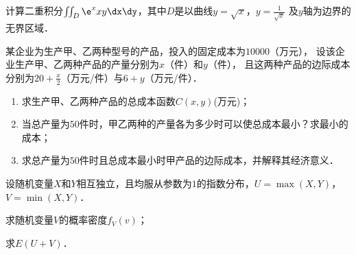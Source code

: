 \documentclass[plain,noanswer,medmath]{../../template/jnuexam}
\begin{document}
\begin{problem}[points=10]
计算二重积分$\iint_D \e^x xy\dx\dy$，其中$D$是以曲线$y = \sqrt{x}$，$y = \frac{1}{\sqrt{x}}$
及$y$轴为边界的无界区域．
\end{problem}


\begin{problem}[points=10]
某企业为生产甲、乙两种型号的产品，投入的固定成本为$10000$（万元），
设该企业生产甲、乙两种产品的产量分别为$x$（件）和$y$（件），
且这两种产品的边际成本分别为$20 + \frac{x}{2}$（万元/件）与$6 + y$（万元/件）．
\begin{enumerate}
\item 求生产甲、乙两种产品的总成本函数$C(x,y)$(万元)；
\item 当总产量为$50$件时，甲乙两种的产量各为多少时可以使总成本最小？求最小的成本；
\item 求总产量为$50$件时且总成本最小时甲产品的边际成本，并解释其经济意义．
\end{enumerate}
\end{problem}












\begin{problem}[points=10]
设随机变量$X$和$Y$相互独立，且均服从参数为$1$的指数分布，$U = \max(X,Y)$，$V = \min(X,Y)$．\par
\begin{enumerate*}
\item 求随机变量$V$的概率密度$f_V(v)$；
\item 求$E\left(U + V \right)$．
\end{enumerate*}
\end{problem}
\end{document}
